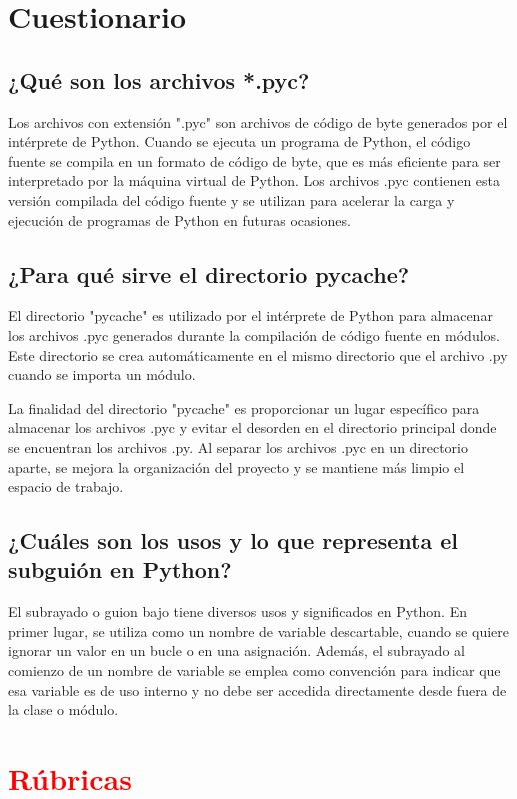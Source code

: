 \documentclass{article}
\begin{document}
\section{Cuestionario}
    \subsection{¿Qué son los archivos *.pyc?}
    Los archivos con extensión ".pyc" son archivos de código de byte generados por el intérprete de Python. Cuando se ejecuta un programa de Python, el código fuente se compila en un formato de código de byte, que es más eficiente para ser interpretado por la máquina virtual de Python. Los archivos .pyc contienen esta versión compilada del código fuente y se utilizan para acelerar la carga y ejecución de programas de Python en futuras ocasiones.
    
     \subsection{¿Para qué sirve el directorio pycache?}
El directorio "pycache" es utilizado por el intérprete de Python para almacenar los archivos .pyc generados durante la compilación de código fuente en módulos. Este directorio se crea automáticamente en el mismo directorio que el archivo .py cuando se importa un módulo.

La finalidad del directorio "pycache" es proporcionar un lugar específico para almacenar los archivos .pyc y evitar el desorden en el directorio principal donde se encuentran los archivos .py. Al separar los archivos .pyc en un directorio aparte, se mejora la organización del proyecto y se mantiene más limpio el espacio de trabajo.
     \subsection{¿Cuáles son los usos y lo que representa el subguión en Python?}
    El subrayado o guion bajo tiene diversos usos y significados en Python. En primer lugar, se utiliza como un nombre de variable descartable, cuando se quiere ignorar un valor en un bucle o en una asignación. Además, el subrayado al comienzo de un nombre de variable se emplea como convención para indicar que esa variable es de uso interno y no debe ser accedida directamente desde fuera de la clase o módulo.

	\section{\textcolor{red}{Rúbricas}}
	
\end{document}

